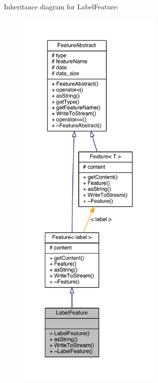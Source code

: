 Inheritance diagram for Label\+Feature\+:
\nopagebreak
\begin{figure}[H]
\begin{center}
\leavevmode
\includegraphics[height=550pt]{class_label_feature__inherit__graph}
\end{center}
\end{figure}



